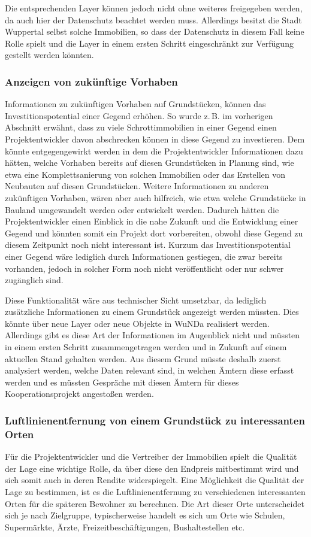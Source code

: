 Die entsprechenden Layer können jedoch nicht ohne weiteres freigegeben werden, da auch hier  der Datenschutz beachtet werden muss.
Allerdings besitzt die Stadt Wuppertal selbst solche Immobilien, so dass der Datenschutz in diesem Fall keine Rolle spielt und die Layer in einem ersten Schritt eingeschränkt zur Verfügung gestellt werden könnten.
  
\subsubsection{Anzeigen von zukünftige Vorhaben}
Informationen zu zukünftigen Vorhaben auf Grundstücken, können das Investitionspotential einer Gegend erhöhen.
So wurde z.\,B. im vorherigen Abschnitt erwähnt, dass zu viele Schrottimmobilien in einer Gegend einen Projektentwickler davon abschrecken können in diese Gegend zu investieren.
Dem könnte entgegengewirkt werden in dem die Projektentwickler Informationen dazu hätten, welche Vorhaben bereits auf diesen Grundstücken in Planung sind, wie etwa eine Komplettsanierung von solchen Immobilien oder das Erstellen von Neubauten auf diesen Grundstücken.
Weitere Informationen zu anderen zukünftigen Vorhaben, wären aber auch hilfreich, wie etwa welche Grundstücke in Bauland umgewandelt werden oder entwickelt werden. 
Dadurch hätten die Projektentwickler einen Einblick in die nahe Zukunft und die Entwicklung einer Gegend und könnten somit ein Projekt dort vorbereiten, obwohl diese Gegend zu diesem Zeitpunkt noch nicht interessant ist.
Kurzum das Investitionspotential einer Gegend wäre lediglich durch Informationen gestiegen, die zwar bereits vorhanden, jedoch in solcher Form noch nicht veröffentlicht oder nur schwer zugänglich sind.

Diese Funktionalität wäre aus technischer Sicht umsetzbar, da lediglich zusätzliche Informationen zu einem Grundstück angezeigt werden müssten.
Dies könnte über neue Layer oder neue Objekte in \ac{WuNDa} realisiert werden.
Allerdings gibt es diese Art der Informationen im Augenblick nicht und müssten in einem ersten Schritt zusammengetragen werden und in Zukunft auf einem aktuellen Stand gehalten werden.
Aus diesem Grund müsste deshalb zuerst analysiert werden, welche Daten relevant sind, in welchen Ämtern diese erfasst werden und es müssten Gespräche mit diesen Ämtern für dieses Kooperationsprojekt angestoßen werden.
 
\subsubsection{Luftlinienentfernung von einem Grundstück zu interessanten Orten}
Für die Projektentwickler und die Vertreiber der Immobilien spielt die Qualität der Lage eine wichtige Rolle, da über diese den Endpreis mitbestimmt wird und sich somit auch in deren Rendite widerspiegelt.
Eine Möglichkeit die Qualität der Lage zu bestimmen, ist es die Luftlinienentfernung zu verschiedenen interessanten Orten für die späteren Bewohner zu berechnen.
Die Art dieser Orte unterscheidet sich je nach Zielgruppe, typischerweise handelt es sich um Orte wie Schulen, Supermärkte, Ärzte, Freizeitbeschäftigungen, Bushaltestellen etc.

